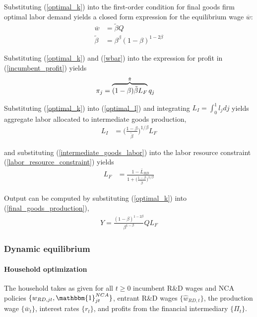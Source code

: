 \documentclass[11pt,english]{article}
\begin{document}
Substituting (\ref{optimal_k}) into the first-order condition for final goods firm optimal labor demand yields a closed form expression for the equilibrium wage $\overline{w}$:
\begin{align}
\overline{w} &= \tilde{\beta} Q \label{wbar} \\
\tilde{\beta} &= \beta^{\beta} (1-\beta)^{1-2\beta} \label{def_cbeta}
\end{align}

Substituting (\ref{optimal_k}) and (\ref{wbar}) into the expression for profit in (\ref{incumbent_profit}) yields
\begin{align}
\pi_j &= \overbrace{(1-\beta) \tilde{\beta} L_F}^{\mathclap{\tilde{\pi}}} q_j \label{profits_eq}
\end{align}

Substituting (\ref{optimal_k}) into (\ref{optimal_l}) and integrating $L_I = \int_0^1 l_j dj$ yields aggregate labor allocated to intermediate goods production,
\begin{align}
L_I &= \Big( \frac{1-\beta}{\tilde{\beta}} \Big)^{1 / \beta} L_F \label{intermediate_goods_labor}
\end{align}

and substituting (\ref{intermediate_goods_labor}) into the labor resource constraint (\ref{labor_resource_constraint}) yields
\begin{align}
L_F &= \frac{1 - \bar{L}_{RD}}{1 + \Big(\frac{1-\beta}{\tilde{\beta}}\Big)^{1/\beta}}
\end{align}

Output can be computed by substituting (\ref{optimal_k}) into (\ref{final_goods_production}), 
\begin{align}
Y = \frac{(1-\beta)^{1-2\beta}}{\beta^{1-\beta}} Q L_F \label{flow_output}
\end{align}

\subsubsection{Dynamic equilibrium}\label{subsubsec:dynamic_equilibrium_original_solution}

\paragraph{Household optimization}

The household takes as given for all $t \ge 0$ incumbent R\&D wages and NCA policies $\{w_{RD,jt}, \mathbbm{1}^{NCA}_{jt}\}$, entrant R\&D wages $\{\hat{w}_{RD,t}\}$, the production wage $\{\bar{w}_t\}$, interest rates $\{r_t\}$, and profits from the financial intermediary $\{\Pi_t\}$. 
\end{document}
